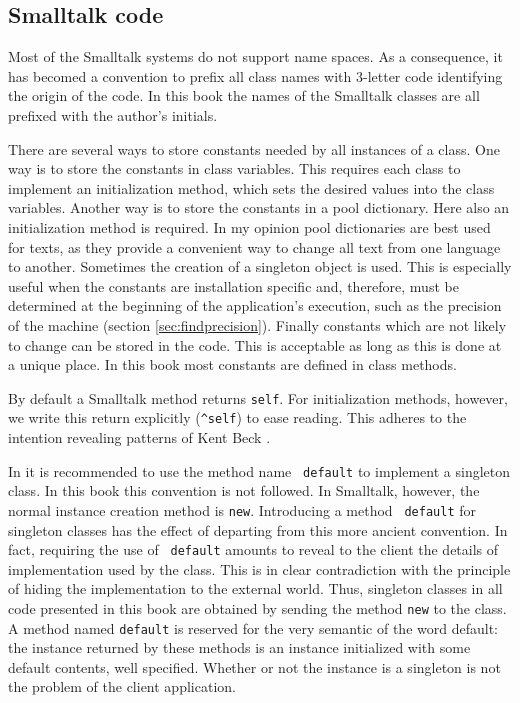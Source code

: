 \documentclass[twoside]{book}
\begin{document}
\subsection{Smalltalk code}
Most of the Smalltalk systems do not support name spaces. As a
consequence, it has becomed a convention to prefix all class names
with 3-letter code identifying the origin of the code. In this
book the names of the Smalltalk classes are all prefixed with the
author's initials.

There are several ways to store constants needed by all instances
of a class. One way is to store the constants in class variables.
This requires each class to implement an initialization method,
which sets the desired values into the class variables. Another
way is to store the constants in a pool dictionary. Here also an
initialization method is required. In my opinion pool dictionaries
are best used for texts, as they provide a convenient way to
change all text from one language to another. Sometimes the
creation of a singleton object is used. This is especially useful
when the constants are installation specific and, therefore, must
be determined at the beginning of the application's execution,
such as the precision of the machine (\cf section
\ref{sec:findprecision}). Finally constants which are not likely
to change can be stored in the code. This is acceptable as long as
this is done at a unique place. In this book most constants are
defined in class methods.

By default a Smalltalk method returns {\tt self}. For
initialization methods, however, we write this return explicitly
({\tt \^\/self}) to ease reading. This adheres to the intention
revealing patterns of Kent Beck \cite{Beck}.

In \cite{StDesPat} it is recommended to use the method name {\tt
default} to implement a singleton class. In this book this
convention is not followed. In Smalltalk, however, the normal
instance creation method is {\tt new}. Introducing a method {\tt
default} for singleton classes has the effect of departing from
this more ancient convention. In fact, requiring the use of {\tt
default} amounts to reveal to the client the details of
implementation used by the class. This is in clear contradiction
with the principle of hiding the implementation to the external
world. Thus, singleton classes in all code presented in this book
are obtained by sending the method {\tt new} to the class. A
method named {\tt default} is reserved for the very semantic of
the word default: the instance returned by these methods is an
instance initialized with some default contents, well specified.
Whether or not the instance is a singleton is not the problem of
the client application.
\end{document}
